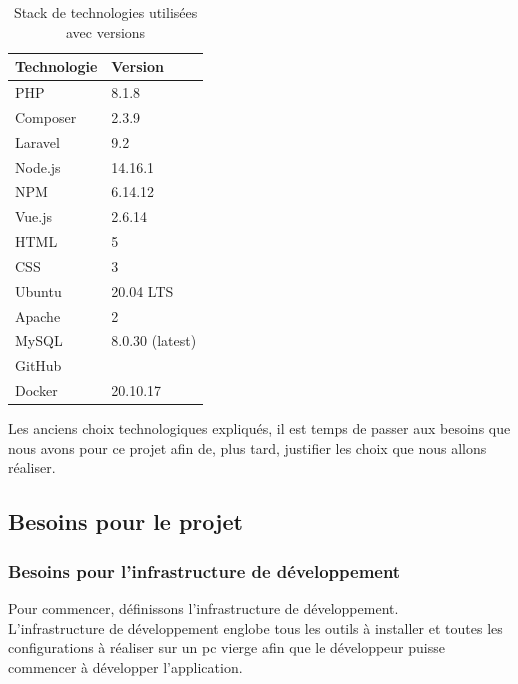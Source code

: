 \documentclass[
    iai, %
    il, %
]{heig-tb}
\begin{document}
\begin{table}[h]
    \begin{center}
        \caption{Stack de technologies utilisées avec versions \label{stack}}
        \begin{tabularx}{1.0\textwidth} {X|X}
            Technologie & Version         \\ \hline
            PHP         & 8.1.8           \\
            Composer    & 2.3.9           \\
            Laravel     & 9.2             \\
            Node.js     & 14.16.1         \\
            NPM         & 6.14.12         \\
            Vue.js      & 2.6.14          \\
            HTML        & 5               \\
            CSS         & 3               \\
            Ubuntu      & 20.04 LTS       \\
            Apache      & 2               \\
            MySQL       & 8.0.30 (latest) \\
            GitHub      &                 \\
            Docker      & 20.10.17        \\
        \end{tabularx}
    \end{center}
\end{table}

Les anciens choix technologiques expliqués, il est temps de passer aux besoins que nous avons pour ce projet afin de, plus tard, justifier les choix que nous allons réaliser.

\subsection{Besoins pour le projet}

\subsubsection{Besoins pour l'infrastructure de développement}
Pour commencer, définissons l'infrastructure de développement.\\
L'infrastructure de développement englobe tous les outils à installer et toutes les configurations à réaliser sur un pc vierge afin que le développeur puisse commencer à développer l'application.
\end{document}
